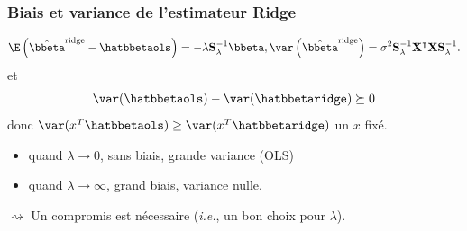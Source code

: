 \documentclass{beamer}\usepackage[]{graphicx}\usepackage[]{color}
\begin{document}
\begin{frame}
  \frametitle{Biais et variance de l'estimateur Ridge}

  \begin{proposition}
    \begin{equation*}
      \E\left(\hat{\bbeta}^{\text{ridge}}-\hatbbetaols\right)   =
      -\lambda \mathbf{S}_\lambda^{-1} \bbeta,       \var\left(\hat{\bbeta}^{\text{ridge}}\right)  =
      \sigma^2 \mathbf{S}_\lambda^{-1} \mathbf{X}^\intercal \mathbf{X}
      \mathbf{S}_\lambda^{-1}.
    \end{equation*}
    et
    \begin{equation*}
      \var(\hatbbetaols) - \var(\hatbbetaridge) \succeq 0
    \end{equation*}
    donc
    $\var(x^T\hatbbetaols) \geq \var(x^T\hatbbetaridge)$ un $x$ fixé.
  \end{proposition}

  \vfill

  \begin{itemize}
  \item quand $\lambda\to 0$, sans biais, grande variance (OLS)
  \item quand $\lambda\to \infty$, grand biais, variance nulle.
  \end{itemize}

  \vfill

  $\rightsquigarrow$  Un compromis  est nécessaire  (\textit{i.e.}, un bon choix pour $\lambda$).

\end{frame}
\end{document}
